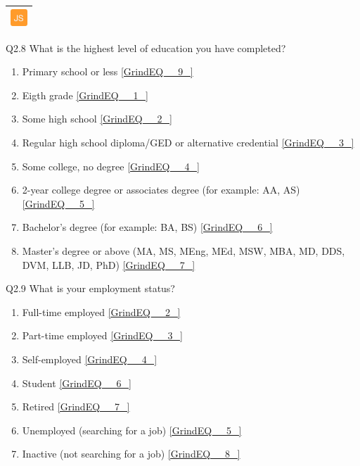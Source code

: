 \documentclass{article} %
\begin{document}
\noindent 

\noindent 

\begin{tabular}{|p{0.2in}|} \hline 
\includegraphics*[width=0.25in, height=0.25in]{image3} \\ \hline 
\end{tabular}



\noindent Q2.8 What is the highest\textbf{ }level\textbf{ }of\textbf{ }education you have completed?

\begin{enumerate}
\item  Primary school or less  \eqref{GrindEQ__9_} 

\item  Eigth grade  \eqref{GrindEQ__1_} 

\item  Some high school  \eqref{GrindEQ__2_} 

\item  Regular high school diploma/GED or alternative credential  \eqref{GrindEQ__3_} 

\item  Some college, no degree  \eqref{GrindEQ__4_} 

\item  2-year college degree or associates degree (for example: AA, AS)  \eqref{GrindEQ__5_} 

\item  Bachelor's degree (for example: BA, BS)  \eqref{GrindEQ__6_} 

\item  Master's degree or above (MA, MS, MEng, MEd, MSW, MBA, MD, DDS, DVM, LLB, JD, PhD)  \eqref{GrindEQ__7_} 
\end{enumerate}

\noindent 

\noindent 

\noindent 

\noindent Q2.9 What is your employment status?

\begin{enumerate}
\item  Full-time employed  \eqref{GrindEQ__2_} 

\item  Part-time employed  \eqref{GrindEQ__3_} 

\item  Self-employed  \eqref{GrindEQ__4_} 

\item  Student  \eqref{GrindEQ__6_} 

\item  Retired  \eqref{GrindEQ__7_} 

\item  Unemployed (searching for a job)  \eqref{GrindEQ__5_} 

\item  Inactive (not searching for a job)  \eqref{GrindEQ__8_} 
\end{enumerate}
\end{document}

